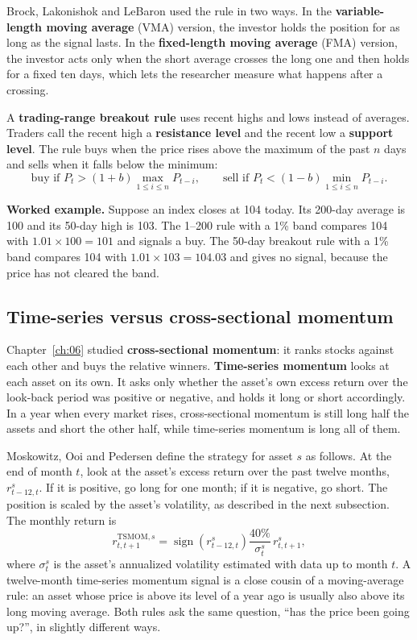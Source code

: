 Brock, Lakonishok and LeBaron used the rule in two ways. In the \textbf{variable-length moving average} (VMA) version, the investor holds the position for as long as the signal lasts. In the \textbf{fixed-length moving average} (FMA) version, the investor acts only when the short average crosses the long one and then holds for a fixed ten days, which lets the researcher measure what happens after a crossing.

A \textbf{trading-range breakout rule} uses recent highs and lows instead of averages. Traders call the recent high a \textbf{resistance level} and the recent low a \textbf{support level}. The rule buys when the price rises above the maximum of the past $n$ days and sells when it falls below the minimum:
\begin{equation}
  \text{buy if } P_t > (1+b)\max_{1\le i\le n} P_{t-i}, \qquad \text{sell if } P_t < (1-b)\min_{1\le i\le n} P_{t-i}.
  \label{eq:09-trb}
\end{equation}

\textbf{Worked example.} Suppose an index closes at 104 today. Its 200-day average is 100 and its 50-day high is 103. The 1--200 rule with a 1\% band compares 104 with $1.01 \times 100 = 101$ and signals a buy. The 50-day breakout rule with a 1\% band compares 104 with $1.01 \times 103 = 104.03$ and gives no signal, because the price has not cleared the band.

\subsection{Time-series versus cross-sectional momentum}

Chapter~\ref{ch:06} studied \textbf{cross-sectional momentum}: it ranks stocks against each other and buys the relative winners. \textbf{Time-series momentum} looks at each asset on its own. It asks only whether the asset's own excess return over the look-back period was positive or negative, and holds it long or short accordingly. In a year when every market rises, cross-sectional momentum is still long half the assets and short the other half, while time-series momentum is long all of them.

Moskowitz, Ooi and Pedersen define the strategy for asset $s$ as follows. At the end of month $t$, look at the asset's excess return over the past twelve months, $r^s_{t-12,t}$. If it is positive, go long for one month; if it is negative, go short. The position is scaled by the asset's volatility, as described in the next subsection. The monthly return is
\begin{equation}
  r^{\text{TSMOM},s}_{t,t+1} = \operatorname{sign}\left(r^s_{t-12,t}\right) \frac{40\%}{\sigma^s_t}\, r^s_{t,t+1},
  \label{eq:09-tsmom}
\end{equation}
where $\sigma^s_t$ is the asset's annualized volatility estimated with data up to month $t$. A twelve-month time-series momentum signal is a close cousin of a moving-average rule: an asset whose price is above its level of a year ago is usually also above its long moving average. Both rules ask the same question, ``has the price been going up?'', in slightly different ways.

